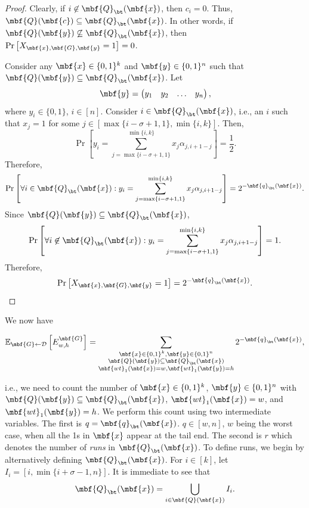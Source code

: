 \begin{proof}
Clearly, if $i \not\in \mbf{Q}_{\bt}(\mbf{x})$, then $c_i = 0$. Thus, $\mbf{Q}(\mbf{c}) \subseteq \mbf{Q}_{\bt}(\mbf{x})$. In other words, if $\mbf{Q}(\mbf{y}) \not\subseteq \mbf{Q}_{\bt}(\mbf{x})$, then $\Pr\left[X_{\mbf{x}, \mbf{G}, \mbf{y}}=1\right]=0$.

Consider any $\mbf{x}\in \{0,1\}^k$ and $\mbf{y} \in \{0,1\}^n$ such that $\mbf{Q}(\mbf{y}) \subseteq \mbf{Q}_{\bt}(\mbf{x})$. Let $$\mbf{y} = \left(\begin{matrix}y_1 & y_2 &\ldots&y_{n}\end{matrix}\right),$$where $y_i \in \{0,1\}$, $i \in [n]$. Consider $i \in \mbf{Q}_{\bt}(\mbf{x})$, i.e., an $i$ such that $x_{j} = 1$ for some $j \in [\max\{i-\sigma+1,1\},\min\{i,k\}]$. Then,$$\Pr\left[y_i = \sum_{j = \max\{i-\sigma+1,1\}}^{\min\{i,k\}}x_j\alpha_{j,i+1-j}\right]=\frac{1}{2}.$$Therefore,$$\Pr\left[\forall i \in \mbf{Q}_{\bt}(\mbf{x}) : y_i = \sum_{j = \max\{i-\sigma+1,1\}}^{\min\{i,k\}}x_j\alpha_{j,i+1-j}\right]=2^{-\mbf{q}_{\bt}(\mbf{x})}.$$Since $\mbf{Q}(\mbf{y}) \subseteq \mbf{Q}_{\bt}(\mbf{x})$, $$\Pr\left[\forall i \not\in \mbf{Q}_{\bt}(\mbf{x}) : y_i = \sum_{j = \max\{i-\sigma+1,1\}}^{\min\{i,k\}}x_j\alpha_{j,i+1-j}\right]=1.$$Therefore,$$\Pr\left[X_{\mbf{x}, \mbf{G}, \mbf{y}}=1\right]=2^{-\mbf{q}_{\bt}(\mbf{x})}.$$ 
\end{proof}

\noindent We now have

\begin{equation}
\mathbb{E}_{\mbf{G} \gets \mathcal{D}}\left[E^{\mbf{G}}_{w,h}\right]=\sum_{\substack{\mbf{x}\in \{0,1\}^k, \mbf{y} \in \{0,1\}^n\\\mbf{Q}(\mbf{y}) \subseteq \mbf{Q}_{\bt}(\mbf{x})\\\mbf{wt}_1(\mbf{x}) = w,\mbf{wt}_1(\mbf{y}) = h}}2^{-\mbf{q}_{\bt}(\mbf{x})},
\end{equation}

i.e., we need to count the number of $\mbf{x}\in \{0,1\}^k$, $\mbf{y} \in \{0,1\}^n$ with $\mbf{Q}(\mbf{y}) \subseteq \mbf{Q}_{\bt}(\mbf{x})$, $\mbf{wt}_1(\mbf{x}) = w$, and $\mbf{wt}_1(\mbf{y}) = h$. We perform this count using two intermediate variables. The first is $q = \mbf{q}_{\bt}(\mbf{x})$. $q\in[w, n]$, $w$ being the worst case, when all the 1s in $\mbf{x}$ appear at the tail end. The second is $r$ which denotes the number of \emph{runs} in $\mbf{Q}_{\bt}(\mbf{x})$. To define runs, we begin by alternatively defining $\mbf{Q}_{\bt}(\mbf{x})$. For $i \in [k]$, let $I_i = [i,\min\{i+\sigma-1,n\}]$. It is immediate to see that$$\mbf{Q}_{\bt}(\mbf{x}) = \bigcup_{i \in \mbf{Q}(\mbf{x})}I_i.$$%

